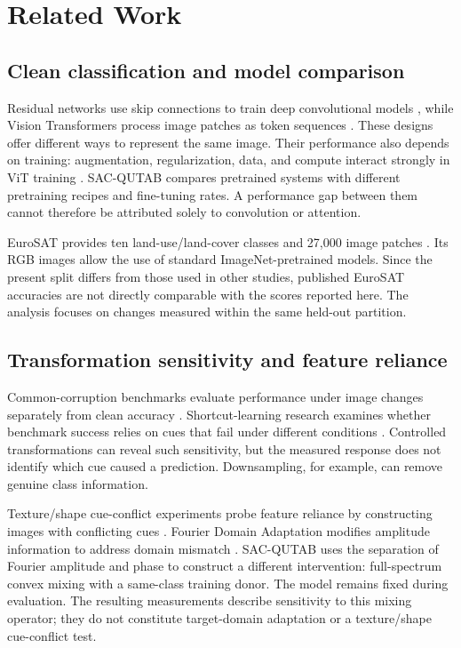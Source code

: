 \section{Related Work}

\subsection{Clean classification and model comparison}

Residual networks use skip connections to train deep convolutional models \cite{resnet}, while Vision Transformers process image patches as token sequences \cite{vit}. These designs offer different ways to represent the same image. Their performance also depends on training: augmentation, regularization, data, and compute interact strongly in ViT training \cite{augreg}. SAC-QUTAB compares pretrained systems with different pretraining recipes and fine-tuning rates. A performance gap between them cannot therefore be attributed solely to convolution or attention.

EuroSAT provides ten land-use/land-cover classes and 27,000 image patches \cite{eurosat}. Its RGB images allow the use of standard ImageNet-pretrained models. Since the present split differs from those used in other studies, published EuroSAT accuracies are not directly comparable with the scores reported here. The analysis focuses on changes measured within the same held-out partition.

\subsection{Transformation sensitivity and feature reliance}

Common-corruption benchmarks evaluate performance under image changes separately from clean accuracy \cite{corruptions}. Shortcut-learning research examines whether benchmark success relies on cues that fail under different conditions \cite{shortcut}. Controlled transformations can reveal such sensitivity, but the measured response does not identify which cue caused a prediction. Downsampling, for example, can remove genuine class information.

Texture/shape cue-conflict experiments probe feature reliance by constructing images with conflicting cues \cite{texture}. Fourier Domain Adaptation modifies amplitude information to address domain mismatch \cite{fda}. SAC-QUTAB uses the separation of Fourier amplitude and phase to construct a different intervention: full-spectrum convex mixing with a same-class training donor. The model remains fixed during evaluation. The resulting measurements describe sensitivity to this mixing operator; they do not constitute target-domain adaptation or a texture/shape cue-conflict test.

